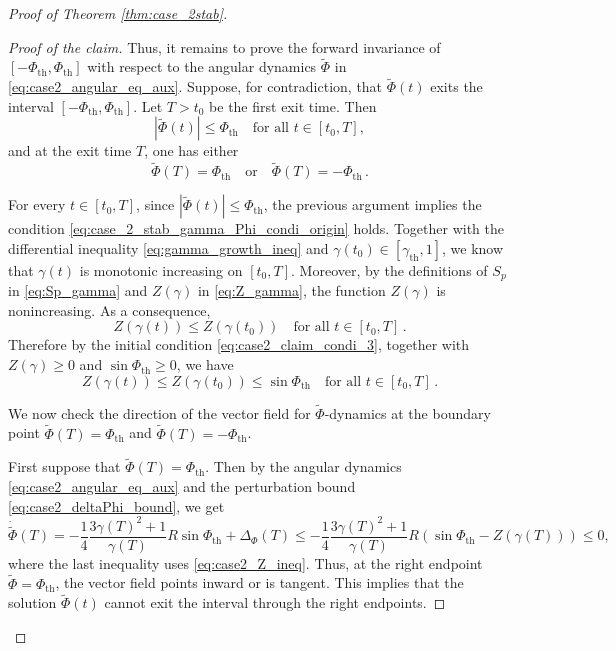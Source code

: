 \documentclass[10pt]{article}
\theoremstyle{definition}
\theoremstyle{definition}
\numberwithin{equation}{section}
\newcommand{\gammaTH}{\gamma_{\mathrm{th}}}
\newcommand{\DeltaPhi}{\Delta_{\Phi}}
\newcommand{\WPhi}{\widetilde{\Phi}}
\newcommand{\PhiTH}{\Phi_{\mathrm{th}}}
\begin{document}
\begin{proof}[Proof of Theorem \ref{thm:case_2stab}]
\begin{proof}[Proof of the claim]
Thus, it remains to prove the forward invariance of $[-\PhiTH, \PhiTH]$ with respect to the angular dynamics $\WPhi$ in \eqref{eq:case2_angular_eq_aux}.
Suppose, for contradiction, that $\WPhi(t)$ exits the interval $[-\PhiTH, \PhiTH]$.
Let $T > t_0$ be the first exit time.
Then
\begin{equation*}
|\WPhi (t)| \leq \PhiTH \quad \text{for all } t \in [t_0, T],
\end{equation*}
and at the exit time $T$, one has either
\begin{equation*}
\WPhi (T) = \PhiTH \quad \text{or} \quad \WPhi(T) = -\PhiTH \, .
\end{equation*}

For every $t \in [t_0, T]$, since $|\WPhi (t)| \leq \PhiTH$, the previous argument implies the condition \eqref{eq:case_2_stab_gamma_Phi_condi_origin} holds.
Together with the differential inequality \eqref{eq:gamma_growth_ineq} and $\gamma(t_0) \in [\gammaTH,1]$, we know that $\gamma(t)$ is monotonic increasing on $[t_0, T]$.
Moreover, by the definitions of $S_p$ in \eqref{eq:Sp_gamma} and $Z(\gamma)$ in \eqref{eq:Z_gamma}, the function $Z(\gamma)$ is nonincreasing. 
As a consequence,
\begin{equation*}
Z(\gamma(t)) \leq Z (\gamma(t_0)) \quad \text{for all } t \in [t_0, T] \, .
\end{equation*}
Therefore by the initial condition \eqref{eq:case2_claim_condi_3}, together with $Z(\gamma) \geq 0$ and $\sin \PhiTH \geq 0$, we have
\begin{equation}\label{eq:case2_Z_ineq}
Z(\gamma(t)) \leq Z (\gamma(t_0)) \leq \sin \PhiTH \quad \text{for all } t \in [t_0, T] \, .
\end{equation}

We now check the direction of the vector field for $\WPhi$-dynamics at the boundary point $\WPhi(T) = \PhiTH$ and $\WPhi(T) = -\PhiTH$.

First suppose that $\WPhi(T) = \PhiTH$.
Then by the angular dynamics \eqref{eq:case2_angular_eq_aux} and the perturbation bound \eqref{eq:case2_deltaPhi_bound}, we get
\begin{equation*}
\Dot{\WPhi}(T) = -\frac{1}{4} \frac{3\gamma(T)^2 + 1}{\gamma(T)} R \sin \PhiTH + \DeltaPhi(T) \leq -\frac{1}{4} \frac{3\gamma(T)^2 + 1}{\gamma(T)} R \left( \sin \PhiTH - Z (\gamma(T)) \right) \leq 0,
\end{equation*}
where the last inequality uses \eqref{eq:case2_Z_ineq}.
Thus, at the right endpoint $\WPhi = \PhiTH$, the vector field points inward or is tangent.
This implies that the solution $\WPhi(t)$ cannot exit the interval through the right endpoints.


\end{proof}
\end{proof}
\end{document}
